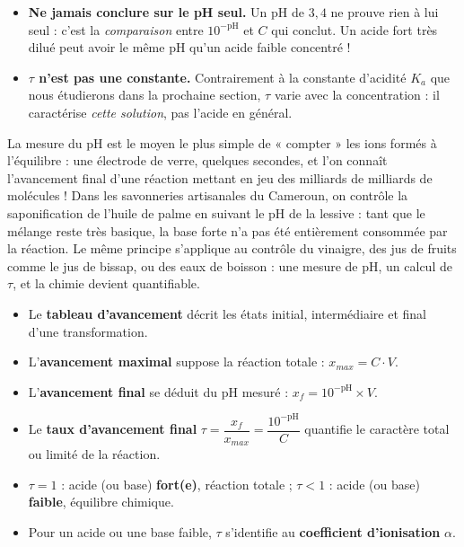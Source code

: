 \documentclass[11pt]{article}
\begin{document}
\begin{attention}
\begin{itemize}
\item \textbf{Ne jamais conclure sur le pH seul.} Un pH de $3{,}4$ ne prouve rien à lui seul : c'est la \emph{comparaison} entre $10^{-\text{pH}}$ et $C$ qui conclut. Un acide fort très dilué peut avoir le même pH qu'un acide faible concentré !
\item \textbf{$\tau$ n'est pas une constante.} Contrairement à la constante d'acidité $K_a$ que nous étudierons dans la prochaine section, $\tau$ varie avec la concentration : il caractérise \emph{cette solution}, pas l'acide en général.
\end{itemize}
\end{attention}

\begin{savaistu}
La mesure du pH est le moyen le plus simple de « compter » les ions  formés à l'équilibre : une électrode de verre, quelques secondes, et l'on connaît l'avancement final d'une réaction mettant en jeu des milliards de milliards de molécules ! Dans les savonneries artisanales du Cameroun, on contrôle la saponification de l'huile de palme en suivant le pH de la lessive : tant que le mélange reste très basique, la base forte  n'a pas été entièrement consommée par la réaction. Le même principe s'applique au contrôle du vinaigre, des jus de fruits comme le jus de bissap, ou des eaux de boisson : une mesure de pH, un calcul de $\tau$, et la chimie devient quantifiable.
\end{savaistu}

\begin{aretenir}
\begin{itemize}
\item Le \textbf{tableau d'avancement} décrit les états initial, intermédiaire et final d'une transformation.
\item L'\textbf{avancement maximal} suppose la réaction totale : $x_{max} = C \cdot V$.
\item L'\textbf{avancement final} se déduit du pH mesuré : $x_f = 10^{-\text{pH}} \times V$.
\item Le \textbf{taux d'avancement final} $\tau = \dfrac{x_f}{x_{max}} = \dfrac{10^{-\text{pH}}}{C}$ quantifie le caractère total ou limité de la réaction.
\item $\tau = 1$ : acide (ou base) \textbf{fort(e)}, réaction totale ; $\tau < 1$ : acide (ou base) \textbf{faible}, équilibre chimique.
\item Pour un acide ou une base faible, $\tau$ s'identifie au \textbf{coefficient d'ionisation} $\alpha$.
\end{itemize}
\end{aretenir}
\end{document}

